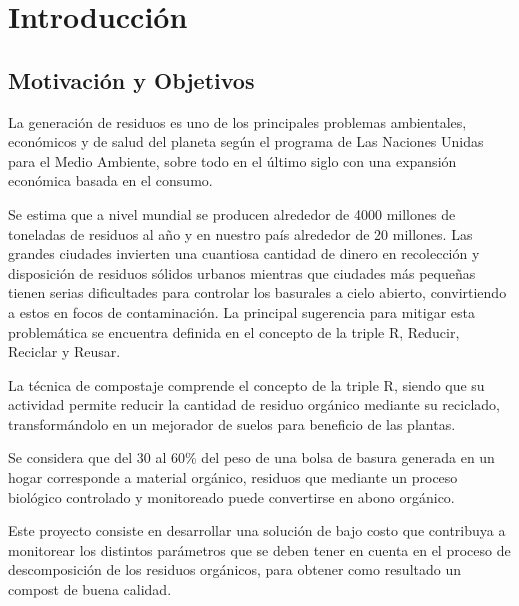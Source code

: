 \chapter{Introducción} 
\label{ChapterIntroduccion} 




\section{Motivación y Objetivos}
\label{sec:MotivacionyObjetivos}

La generación de residuos es uno de los principales problemas ambientales, económicos y de salud del planeta según el programa de Las Naciones Unidas para el Medio Ambiente\citep{GWMO2024}, sobre todo en el último siglo con una expansión económica basada en el consumo.

Se estima que a nivel mundial se producen alrededor de 4000 millones de toneladas de residuos al año y en nuestro país alrededor de 20 millones. Las grandes ciudades invierten una cuantiosa cantidad de dinero en recolección y disposición de residuos sólidos urbanos mientras que ciudades más pequeñas tienen serias dificultades para controlar los basurales a cielo abierto, convirtiendo a estos en focos de contaminación.
La principal sugerencia para mitigar esta problemática se encuentra definida en el concepto de la triple R, Reducir, Reciclar y Reusar.

La técnica de compostaje comprende el concepto de la triple R, siendo que su actividad permite reducir la cantidad de residuo orgánico mediante su reciclado, transformándolo en un mejorador de suelos para beneficio de las plantas.

Se considera que del 30 al 60\% del peso de una bolsa de basura generada en un hogar corresponde a material orgánico, residuos que mediante un proceso biológico controlado y monitoreado puede convertirse en abono orgánico.

Este proyecto consiste en desarrollar una solución de bajo costo que contribuya a monitorear los distintos parámetros que se deben tener en cuenta en el proceso de descomposición de los residuos orgánicos, para obtener como resultado un compost de buena calidad.


